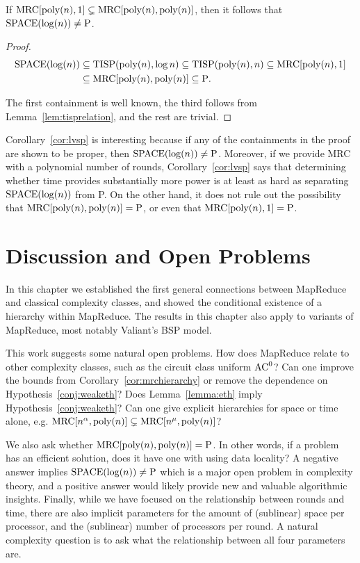 \begin{corollary} \label{cor:lvsp}
If $\textup{MRC}[\textup{poly}(n), 1] \subsetneq \textup{MRC}[\textup{poly}(n),
\textup{poly}(n)]$, then it follows that $\textup{SPACE}(\log(n)) \neq \textup{P}$.
\end{corollary}

\begin{proof}
\begin{align*}	\textup{SPACE}(\log(n)) &\subseteq \textup{TISP}(\textup{poly}(n), \log n) \subseteq
\textup{TISP}(\textup{poly}(n), n) \subseteq \textup{MRC}[\textup{poly}(n), 1] \\ &\subseteq
\textup{MRC}[\textup{poly}(n), \textup{poly}(n)] \subseteq \textup{P}.\end{align*}

The first containment is well known, the third follows from 
Lemma~\ref{lem:tisprelation}, and the rest are trivial.
\end{proof}

Corollary~\ref{cor:lvsp} is interesting because if any of the containments in
the proof are shown to be proper, then $\textup{SPACE}(\log(n)) \neq \textup{P}$. Moreover, if we provide
MRC with a polynomial number of rounds, Corollary~\ref{cor:lvsp} says that
determining whether time provides substantially more power is at least as hard
as separating $\textup{SPACE}(\log(n))$ from P. On the other hand, it does not rule out the possibility
that $\textup{MRC}[\textup{poly}(n), \textup{poly}(n)] = \textup{P}$, or even that
$\textup{MRC}[\textup{poly}(n), 1] = \textup{P}$.

\section{Discussion and Open Problems}\label{sec:openproblems}

In this chapter we established the first general connections between MapReduce
and classical complexity classes, and showed the conditional existence of a
hierarchy within MapReduce. The results in this chapter also apply to variants
of MapReduce, most notably Valiant's BSP model.  

This work suggests some natural open problems. How does MapReduce relate to
other complexity classes, such as the circuit class uniform $\textup{AC}^0$?
Can one improve the bounds from Corollary~\ref{cor:mrchierarchy} or remove the
dependence on Hypothesis~\ref{conj:weaketh}? Does Lemma~\ref{lemma:eth} imply
Hypothesis~\ref{conj:weaketh}? Can one give explicit hierarchies for space or
time alone, e.g. $\textup{MRC}[n^\alpha, \text{poly}(n)] \subsetneq \textup{MRC}[n^\mu,
\text{poly}(n)]$?

We also ask whether $\textup{MRC}[\text{poly}(n), \text{poly}(n)] = \textup{P}$. In other
words, if a problem has an efficient solution, does it have one with using data
locality? A negative answer implies $\textup{SPACE}(\log(n)) \neq\textup{P}$ which is a major open problem in
complexity theory, and a positive answer would likely provide new and valuable
algorithmic insights. Finally, while we have focused on the relationship
between rounds and time, there are also implicit parameters for the amount of
(sublinear) space per processor, and the (sublinear) number of processors per
round. A natural complexity question is to ask what the relationship
between all four parameters are.

